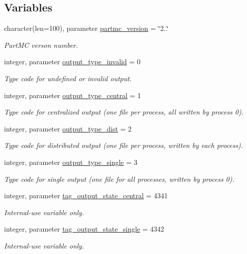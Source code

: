 \subsection*{Variables}
\begin{DoxyCompactItemize}
\item 
character(len=100), parameter \mbox{\hyperlink{namespacepmc__output_a5e58f12b9a77a18071fb7de24524848f}{partmc\+\_\+version}} = \char`\"{}2..\char`\"{}
\begin{DoxyCompactList}\small\item\em Part\+MC verson number. \end{DoxyCompactList}\item 
integer, parameter \mbox{\hyperlink{namespacepmc__output_a3802b8c5d6df146ecc2dd6d5094b122f}{output\+\_\+type\+\_\+invalid}} = 0
\begin{DoxyCompactList}\small\item\em Type code for undefined or invalid output. \end{DoxyCompactList}\item 
integer, parameter \mbox{\hyperlink{namespacepmc__output_aab24776fdca2884a7d5886a3f772fe4d}{output\+\_\+type\+\_\+central}} = 1
\begin{DoxyCompactList}\small\item\em Type code for centralized output (one file per process, all written by process 0). \end{DoxyCompactList}\item 
integer, parameter \mbox{\hyperlink{namespacepmc__output_a83a7b3e4fe2b85b24c022d230fa0d012}{output\+\_\+type\+\_\+dist}} = 2
\begin{DoxyCompactList}\small\item\em Type code for distributed output (one file per process, written by each process). \end{DoxyCompactList}\item 
integer, parameter \mbox{\hyperlink{namespacepmc__output_af747821e7522d6b0c5217faa79fc1b01}{output\+\_\+type\+\_\+single}} = 3
\begin{DoxyCompactList}\small\item\em Type code for single output (one file for all processes, written by process 0). \end{DoxyCompactList}\item 
integer, parameter \mbox{\hyperlink{namespacepmc__output_af6ce65b9d2ef20e03fc0ed4a4b478a44}{tag\+\_\+output\+\_\+state\+\_\+central}} = 4341
\begin{DoxyCompactList}\small\item\em Internal-\/use variable only. \end{DoxyCompactList}\item 
integer, parameter \mbox{\hyperlink{namespacepmc__output_a7385761091e132dc082a72fa05a83180}{tag\+\_\+output\+\_\+state\+\_\+single}} = 4342
\begin{DoxyCompactList}\small\item\em Internal-\/use variable only. \end{DoxyCompactList}\end{DoxyCompactItemize}


